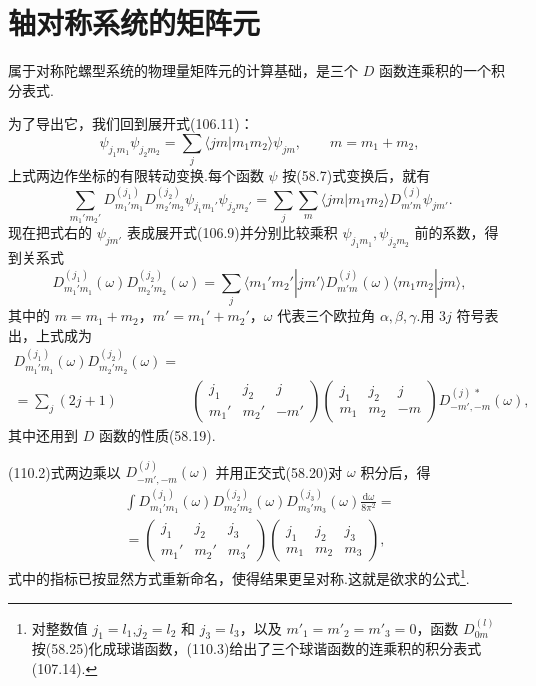 \section{轴对称系统的矩阵元}

属于对称陀螺型系统的物理量矩阵元的计算基础，是三个 $D$ 函数连乘积的一个积分表式.

为了导出它，我们回到展开式(106.11)：
\begin{equation*}
  \psi_{j_1m_1}\psi_{j_2m_2}
  =\sum_j\langle jm|m_1m_2\rangle\psi_{jm},
  \qquad m=m_1+m_2,
\end{equation*}
上式两边作坐标的有限转动变换.每个函数 $\psi$ 按(58.7)式变换后，就有
\begin{equation*}
  \sum_{m_1'm_2'}D^{(j_1)}_{m_1'm_1}D^{(j_2)}_{m_2'm_2}
  \psi_{j_1m_1'}\psi_{j_2m_2'}
  =\sum_j\sum_m\langle jm|m_1m_2\rangle D^{(j)}_{m'm}\psi_{jm'}.
\end{equation*}
现在把式右的 $\psi_{jm'}$ 表成展开式(106.9)并分别比较乘积 $\psi_{j_1m_1},\psi_{j_2m_2}$ 前的系数，得到关系式
\begin{equation}
  D^{(j_1)}_{m_1'm_1}(\omega)D^{(j_2)}_{m_2'm_2}(\omega)
  =\sum_j\langle m_1'm_2'|jm'\rangle D^{(j)}_{m'm}(\omega)
  \langle m_1m_2|jm\rangle,
\end{equation}
其中的 $m=m_1+m_2$，$m'=m_1'+m_2'$，$\omega$ 代表三个欧拉角 $\alpha,\beta,\gamma$.用 $3j$ 符号表出，上式成为
\begin{equation}
\begin{aligned}
  D^{(j_1)}_{m_1'm_1}(\omega)D^{(j_2)}_{m_2'm_2}(\omega)=\\
  =\sum_j(2j+1)&\left(\begin{array}{ccc}j_1&j_2&j\\m_1'&m_2'&-m'\end{array}\right)
  \left(\begin{array}{ccc}j_1&j_2&j\\m_1&m_2&-m\end{array}\right)
  D^{(j)\,*}_{-m',-m}(\omega),
\end{aligned}
\end{equation}
其中还用到 $D$ 函数的性质(58.19).

(110.2)式两边乘以 $D^{(j)}_{-m',-m}(\omega)$ 并用正交式(58.20)对 $\omega$ 积分后，得
\begin{equation}
\begin{aligned}
  \int D^{(j_1)}_{m_1'm_1}(\omega)D^{(j_2)}_{m_2'm_2}(\omega)
  D^{(j_3)}_{m_3'm_3}(\omega)\frac{\mathrm{d}\omega}{8\pi^2}=\\
  =\left(\begin{array}{ccc}j_1&j_2&j_3\\m_1'&m_2'&m_3'\end{array}\right)
  \left(\begin{array}{ccc}j_1&j_2&j_3\\m_1&m_2&m_3\end{array}\right),
\end{aligned}
\end{equation}
式中的指标已按显然方式重新命名，使得结果更呈对称.这就是欲求的公式\footnote{对整数值 $j_1=l_1$,$j_2=l_2$ 和 $j_3=l_3$，以及 $m'_1=m'_2=m'_3=0$，函数 $D^{(l)}_{0m}$ 按(58.25)化成球谐函数，(110.3)给出了三个球谐函数的连乘积的积分表式(107.14).}.

